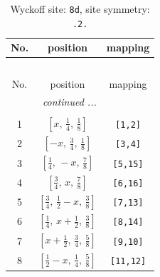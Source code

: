 \documentclass[fleqn,8pt]{jsarticle}
\begin{document}
\begin{longtable}{ccc}
\caption{Wyckoff site: {\tt 8d}, site symmetry: {\tt .2.}}
 \\
 \hline \hline
No. & position & mapping \\ \hline \endfirsthead

\multicolumn{2}{l}{\tablename\ \thetable{}} \\
 \hline \hline
No. & position & mapping \\ \hline \endhead

 \hline \hline
\multicolumn{2}{r}{\footnotesize\it continued ...} \\ \endfoot

 \hline \hline
\multicolumn{2}{r}{} \\ \endlastfoot

1 & $\left[ x,\, \frac{1}{4},\, \frac{1}{8} \right]$ & {\tt [1,2]} \\ \hline
2 & $\left[ - x,\, \frac{3}{4},\, \frac{1}{8} \right]$ & {\tt [3,4]} \\ \hline
3 & $\left[ \frac{1}{4},\, - x,\, \frac{7}{8} \right]$ & {\tt [5,15]} \\ \hline
4 & $\left[ \frac{3}{4},\, x,\, \frac{7}{8} \right]$ & {\tt [6,16]} \\ \hline
5 & $\left[ \frac{3}{4},\, \frac{1}{2} - x,\, \frac{3}{8} \right]$ & {\tt [7,13]} \\ \hline
6 & $\left[ \frac{1}{4},\, x + \frac{1}{2},\, \frac{3}{8} \right]$ & {\tt [8,14]} \\ \hline
7 & $\left[ x + \frac{1}{2},\, \frac{3}{4},\, \frac{5}{8} \right]$ & {\tt [9,10]} \\ \hline
8 & $\left[ \frac{1}{2} - x,\, \frac{1}{4},\, \frac{5}{8} \right]$ & {\tt [11,12]} \\
\end{longtable}
\renewcommand{\arraystretch}{1.2}
\end{document}
